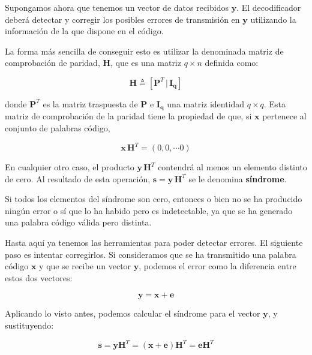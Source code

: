 \documentclass[es,apuntes]{uah}
\begin{document}
Supongamos ahora que tenemos un vector de datos recibidos $\mathbf{y}$. El decodificador deberá detectar y corregir los posibles errores de transmisión en $\mathbf{y}$ utilizando la información de la que dispone en el código. 

La forma más sencilla de conseguir esto es utilizar la denominada matriz de comprobación de paridad, $\mathbf{H}$, que es una matriz $q \times n$ definida como:

\begin{displaymath}
	\mathbf{H} \triangleq \left [ \mathbf{P}^T \, | \, \mathbf{I_q} \right ]
\end{displaymath}

donde $\mathbf{P}^T$ es la matriz traspuesta de $\mathbf{P}$ e $\mathbf{I_q}$ una matriz identidad $q \times q$. Esta matriz de comprobación de la paridad tiene la propiedad de que, si $\mathbf{x}$ pertenece al conjunto de palabras código,  

\begin{displaymath}
	\mathbf{x} \, \mathbf{H}^T = (0, 0 , \cdots 0)
\end{displaymath}

En cualquier otro caso, el producto $\mathbf{y} \, \mathbf{H}^T$ contendrá al menos un elemento distinto de cero. Al resultado de esta operación, $\mathbf{s} = \mathbf{y} \,  \mathbf{H}^T$ se le denomina {\bf síndrome}. 

Si todos los elementos del síndrome son cero, entonces o bien no se ha producido ningún error o sí que lo ha habido pero es indetectable, ya que se ha generado una palabra código válida pero distinta. 

Hasta aquí ya tenemos las herramientas para poder detectar errores. El siguiente paso es intentar corregirlos. Si consideramos que se ha transmitido una palabra código $\mathbf{x}$ y que se recibe un vector $\mathbf{y}$, podemos el error como la diferencia entre estos dos vectores:

\begin{displaymath}
	\mathbf{y} = \mathbf{x} + \mathbf{e}
\end{displaymath} 

Aplicando lo visto antes, podemos calcular el síndrome para el vector $\mathbf{y}$, y sustituyendo:

\begin{displaymath}
	\mathbf{s} = \mathbf{y} 	\mathbf{H}^T = (\mathbf{x} + \mathbf{e}) \mathbf{H}^T = \mathbf{e} \mathbf{H}^T
\end{displaymath}
\end{document}
